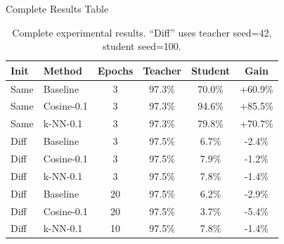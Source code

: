 \documentclass{beamer}
\begin{document}
\begin{frame}{Complete Results Table}

\small
\begin{table}
\centering
\begin{tabular}{llcccc}
\toprule
Init & Method & Epochs & Teacher & Student & Gain \\
\midrule
Same & Baseline & 3 & 97.3\% & 70.0\% & +60.9\% \\
Same & Cosine-0.1 & 3 & 97.3\% & 94.6\% & +85.5\% \\
Same & k-NN-0.1 & 3 & 97.3\% & 79.8\% & +70.7\% \\
\midrule
Diff & Baseline & 3 & 97.5\% & 6.7\% & -2.4\% \\
Diff & Cosine-0.1 & 3 & 97.5\% & 7.9\% & -1.2\% \\
Diff & k-NN-0.1 & 3 & 97.5\% & 7.8\% & -1.4\% \\
\midrule
Diff & Baseline & 20 & 97.5\% & 6.2\% & -2.9\% \\
Diff & Cosine-0.1 & 20 & 97.5\% & 3.7\% & -5.4\% \\
Diff & k-NN-0.1 & 10 & 97.5\% & 7.8\% & -1.4\% \\
\bottomrule
\end{tabular}
\caption{Complete experimental results. ``Diff'' uses teacher seed=42, student seed=100.}
\end{table}

\end{frame}
\end{document}
